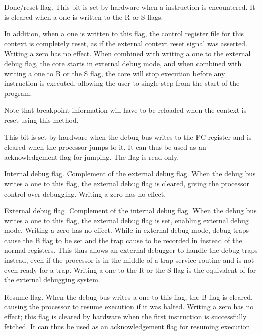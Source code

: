 Done/reset flag. This bit is set by hardware when a  instruction is 
encountered. It is cleared when a one is written to the R or S flags.

In addition, when a one is written to this flag, the control register file for 
this context is completely reset, as if the external context reset signal was 
asserted. Writing a zero has no effect. When combined with writing a one to the 
external debug flag, the core starts in external debug mode, and when combined 
with writing a one to B or the S flag, the core will stop execution before any 
instruction is executed, allowing the user to single-step from the start of the 
program.

Note that breakpoint information will have to be reloaded when the context is 
reset using this method.


This bit is set by hardware when the debug bus writes to the PC register and is 
cleared when the processor jumps to it. It can thus be used as an acknowledgement
flag for jumping. The flag is read only.

\debugCanWrite{}

Internal debug flag. Complement of the external debug flag. When the debug bus 
writes a one to this flag, the external debug flag is cleared, giving the
processor control over debugging. Writing a zero has no effect.

\debugCanWrite{}

External debug flag. Complement of the internal debug flag. When the debug bus 
writes a one to this flag, the external debug flag is set, enabling external
debug mode. Writing a zero has no effect. While in external debug mode, debug
traps cause the B flag to be set and the trap cause to be recorded in 
instead of the normal registers. This thus allows an external debugger to handle
the debug traps instead, even if the processor is in the middle of a trap
service routine and is not even ready for a trap. Writing a one to the R or the
S flag is the equivalent of  for the external debugging system.

\debugCanWrite{}

Resume flag. When the debug bus writes a one to this flag, the B flag is
cleared, causing the processor to resume execution if it was halted. Writing a
zero has no effect; this flag is cleared by hardware when the first instruction
is successfully fetched. It can thus be used as an acknowledgement flag for
resuming execution.

